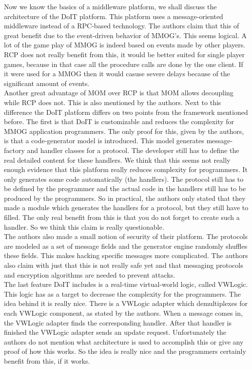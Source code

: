 \noindent Now we know the basics of a middleware platform, we shall discuss the architecture of the DoIT platform. 
This platform uses a message-oriented middleware instead of a RPC-based technology. 
The authors claim that this of great benefit due to the event-driven behavior of MMOG's. 
This seems logical. A lot of the game play of MMOG is indeed based on events made by other players. 
RCP does not really benefit from this, it would be better suited for single player games, because in that case all the procedure calls are done by the one client. 
If it were used for a MMOG then it would casuse severe delays because of the significant amount of events.\\
\indent Another great advantage of MOM over RCP is that MOM allows decoupling while RCP does not. 
This is also mentioned by the authors. 
Next to this difference the DoIT platform differs on two points from the framework mentioned before. 
The first is that DoIT is customizable and reduces the complexity for MMOG application programmers. 
The only proof for this, given by the authors, is that a code-generator model is introduced. 
This model generates message-factory and handler classes for a protocol. 
The developer still has to define the real detailed content for these handlers. 
We think that this seems not really enough evidence that this platform really reduces complexity for programmers. 
It only generates some code automatically (the handlers). 
The protocol still has to be defined by the programmer and the actual code in the handlers still has to be produced by the programmers. 
So in practical, the authors only stated that they made a module which generates the handlers for a protocol, but they still have to filled. The only real benefit from this is that you do not forget to create such a handler. So we think this claim is really questionable.\\
\indent The authors also made a small notion of security of their platform. 
The protocols are modeled as a set of message fields and the generator engine randomly shuffles these fields. 
This makes hacking specific messages more complicated. 
The authors also claim with just that this is not really safe yet and that messaging protocols and encryption algorithms are needed to prevent attacks.\\
\indent The last feature DoIT includes is a real-time virtual-world logic, called VWLogic. 
This logic has as a target to decrease the complexity for the programmers. 
The idea behind it is really nice. 
There is a VWLogic adapter which demultiplexes for each VWLogic component, as stated by the authors. 
When a message comes in, the VWLogic adapter finds the corresponding handler. 
After that handler is finished the VWLogic adapter sends an update request. 
Unfortunately the authors do not mention what architecture is used to accomplish this or give any proof of how this works. 
So the idea is really nice and the programmers certainly benefit from this, if it works.\\

